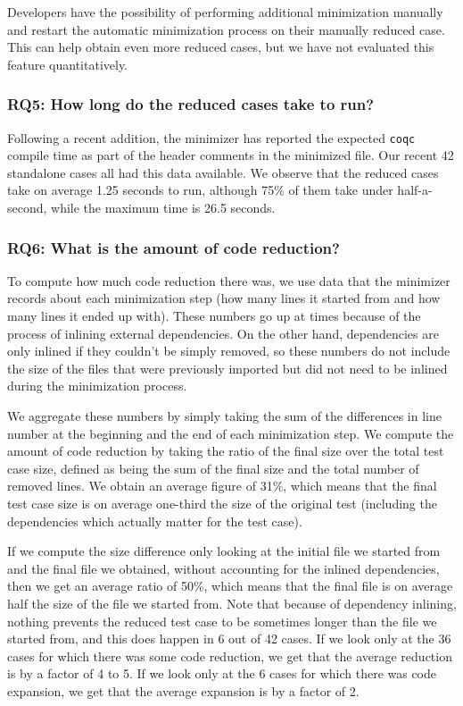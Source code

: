 \documentclass[a4paper,USenglish,cleveref,autoref,thm-restate]{lipics-v2021}
\begin{document}
Developers have the possibility of performing additional minimization manually and restart the automatic minimization process on their manually reduced case. This can help obtain even more reduced cases, but we have not evaluated this feature quantitatively.

\subsubsection{RQ5: How long do the reduced cases take to run?}

Following a recent addition, the minimizer has reported the expected \texttt{coqc} compile time as part of the header comments in the minimized file. Our recent 42 standalone cases all had this data available. We observe that the reduced cases take on average 1.25 seconds to run, although 75\% of them take under half-a-second, while the maximum time is 26.5 seconds.

\subsubsection{RQ6: What is the amount of code reduction?}

To compute how much code reduction there was, we use data that the minimizer records about each minimization step (how many lines it started from and how many lines it ended up with). These numbers go up at times because of the process of inlining external dependencies. On the other hand, dependencies are only inlined if they couldn't be simply removed, so these numbers do not include the size of the files that were previously imported but did not need to be inlined during the minimization process.

We aggregate these numbers by simply taking the sum of the differences in line number at the beginning and the end of each minimization step. We compute the amount of code reduction by taking the ratio of the final size over the total test case size, defined as being the sum of the final size and the total number of removed lines. We obtain an average figure of 31\%, which means that the final test case size is on average one-third the size of the original test (including the dependencies which actually matter for the test case).

If we compute the size difference only looking at the initial file we started from and the final file we obtained, without accounting for the inlined dependencies, then we get an average ratio of 50\%, which means that the final file is on average half the size of the file we started from. Note that because of dependency inlining, nothing prevents the reduced test case to be sometimes longer than the file we started from, and this does happen in 6 out of 42 cases. If we look only at the 36 cases for which there was some code reduction, we get that the average reduction is by a factor of 4 to 5. If we look only at the 6 cases for which there was code expansion, we get that the average expansion is by a factor of 2.
\end{document}

